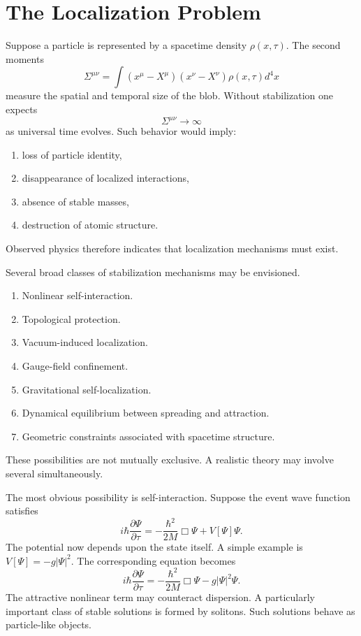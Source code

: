 \section{The Localization Problem}
Suppose a particle is represented by a spacetime density
$\rho(x,\tau).$
The second moments
\[
\Sigma^{\mu\nu} = \int (x^\mu-X^\mu) (x^\nu-X^\nu) \rho(x,\tau) d^4x
\]
measure the spatial and temporal size of the blob.
Without stabilization one expects
\[
\Sigma^{\mu\nu} \rightarrow \infty
\]
as universal time evolves.
Such behavior would imply:
\begin{enumerate}
\item loss of particle identity,
\item disappearance of localized interactions,
\item absence of stable masses,
\item destruction of atomic structure.
\end{enumerate}
Observed physics therefore indicates that localization mechanisms must
exist.

Several broad classes of stabilization mechanisms may be envisioned.
\begin{enumerate}
\item Nonlinear self-interaction.
\item Topological protection.
\item Vacuum-induced localization.
\item Gauge-field confinement.
\item Gravitational self-localization.
\item Dynamical equilibrium between spreading and attraction.
\item Geometric constraints associated with spacetime structure.
\end{enumerate}
These possibilities are not mutually exclusive.
A realistic theory may involve several simultaneously.

The most obvious possibility is self-interaction.
Suppose the event wave function satisfies
\[
i\hbar \frac{\partial \Psi} {\partial \tau}=
-\frac{\hbar^2}{2M}\Box\Psi+V[\Psi]\Psi.
\]
The potential now depends upon the state itself.
A simple example is $V[\Psi]=-g|\Psi|^2.$
The corresponding equation becomes
\[
i\hbar \frac{\partial \Psi}{\partial \tau}=
-\frac{\hbar^2}{2M}\Box\Psi-g|\Psi|^2\Psi.
\]
The attractive nonlinear term may counteract dispersion.
A particularly important class of stable solutions is formed by solitons.
Such solutions behave as particle-like objects.

